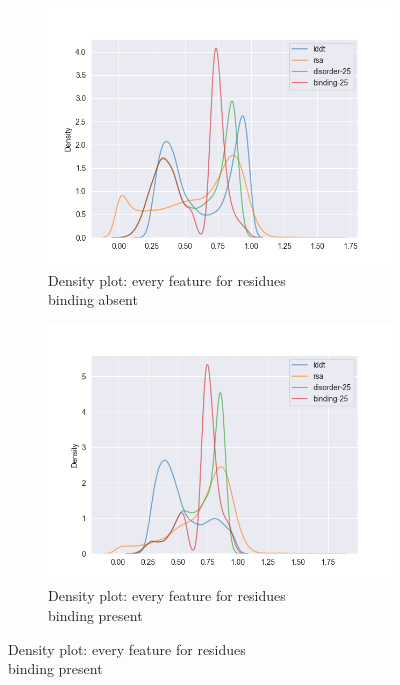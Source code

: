 \begin{figure}[h!]
    \begin{subfigure}{0.6\linewidth}
        \includegraphics[width=\linewidth]{res/analysis/plots/bind0-density_all.png}
        \caption{Density plot: every feature for residues\\binding absent}
    \end{subfigure}
    \begin{subfigure}{0.6\linewidth}
        \includegraphics[width=\linewidth]{res/analysis/plots/bind1-density_all.png}
        \caption{Density plot: every feature for residues\\binding present}
    \end{subfigure}
\end{figure}
\vspace{5em}
\pagebreak

